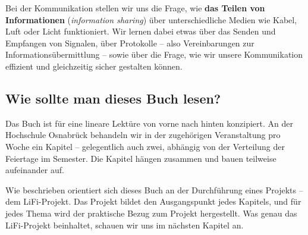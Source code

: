 \documentclass[
  letterpaper,
  DIV=11]{scrartcl}
\begin{document}
Bei der Kommunikation stellen wir uns die Frage, wie \textbf{das Teilen
von Informationen} (\emph{information sharing}) über unterschiedliche
Medien wie Kabel, Luft oder Licht funktioniert. Wir lernen dabei etwas
über das Senden und Empfangen von Signalen, über Protokolle -- also
Vereinbarungen zur Informationsübermittlung -- sowie über die Frage, wie
wir unsere Kommunikation effizient und gleichzeitig sicher gestalten
können.

\subsection{Wie sollte man dieses Buch
lesen?}\label{wie-sollte-man-dieses-buch-lesen}

Das Buch ist für eine lineare Lektüre von vorne nach hinten konzipiert.
An der Hochschule Osnabrück behandeln wir in der zugehörigen
Veranstaltung pro Woche ein Kapitel -- gelegentlich auch zwei, abhängig
von der Verteilung der Feiertage im Semester. Die Kapitel hängen
zusammen und bauen teilweise aufeinander auf.

Wie beschrieben orientiert sich dieses Buch an der Durchführung eines
Projekts -- dem LiFi-Projekt. Das Projekt bildet den Ausgangspunkt jedes
Kapitels, und für jedes Thema wird der praktische Bezug zum Projekt
hergestellt. Was genau das LiFi-Projekt beinhaltet, schauen wir uns im
nächsten Kapitel an.
\end{document}
